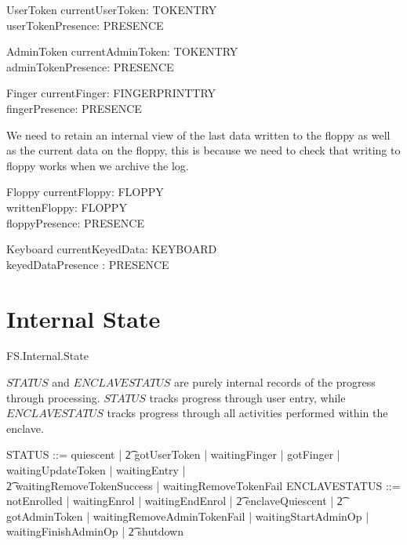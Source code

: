 \begin{schema}{UserToken}
	currentUserToken: TOKENTRY
\\	userTokenPresence: PRESENCE
\end{schema}

\begin{schema}{AdminToken}
	currentAdminToken: TOKENTRY
\\	adminTokenPresence: PRESENCE
\end{schema}

\begin{schema}{Finger}
	currentFinger: FINGERPRINTTRY
\\	fingerPresence: PRESENCE
\end{schema}

We need to retain an internal view of the last data written to the
floppy as well as the current data on the floppy, this is because we
need to check that writing to floppy works when we archive the log.
\begin{schema}{Floppy}
	currentFloppy: FLOPPY
\\      writtenFloppy: FLOPPY
\\	floppyPresence: PRESENCE
\end{schema}

\begin{schema}{Keyboard}
        currentKeyedData: KEYBOARD
\\      keyedDataPresence : PRESENCE
\end{schema}  

\section{Internal State}

\begin{traceunit}{FS.Internal.State}
\end{traceunit}


$STATUS$ and $ENCLAVESTATUS$ are purely internal records of the progress through 
processing. $STATUS$ tracks progress through user entry, while
$ENCLAVESTATUS$ tracks progress through all activities performed
within the enclave. 

\begin{zed}
	STATUS ::= quiescent | 
\also \t2          gotUserToken |  waitingFinger | gotFinger | waitingUpdateToken | waitingEntry |
\\ \t2          waitingRemoveTokenSuccess | waitingRemoveTokenFail 
\also
        ENCLAVESTATUS ::= notEnrolled | waitingEnrol | waitingEndEnrol |
\also \t2          enclaveQuiescent |
\also \t2          gotAdminToken | waitingRemoveAdminTokenFail |
waitingStartAdminOp | waitingFinishAdminOp |
\also \t2          shutdown 
\end{zed}

